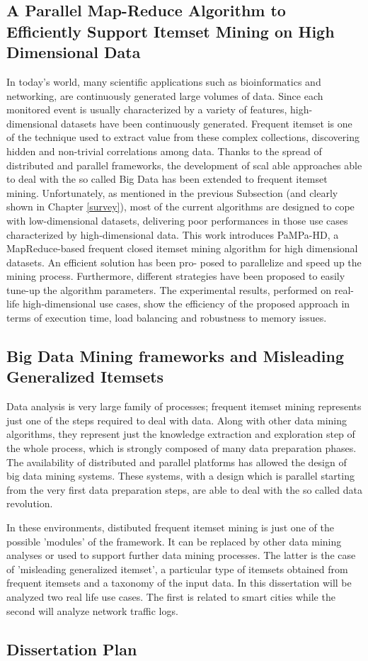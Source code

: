\subsection{A Parallel Map-Reduce Algorithm to Efficiently
Support Itemset Mining on High Dimensional Data}
In today's world, many scientific applications such as bioinformatics and networking, are continuously generated large volumes of data. Since
each monitored event is usually characterized by a variety of features, high-
dimensional datasets have been continuously generated. 
Frequent itemset is one of the technique used to extract value from these complex collections, discovering hidden and non-trivial correlations among data. 
Thanks to the spread of distributed and parallel frameworks, the development of scal
able approaches able to deal with the so called Big Data has been extended
to frequent itemset mining. Unfortunately, as mentioned in the previous Subsection (and clearly shown in Chapter \ref{survey}), most of the current algorithms are designed to cope with low-dimensional datasets, delivering poor performances in those use cases characterized by high-dimensional data. This work introduces 
PaMPa-HD, a MapReduce-based frequent closed itemset mining
algorithm for high dimensional datasets. An efficient solution has been pro-
posed to parallelize and speed up the mining process. Furthermore, different
strategies have been proposed to easily tune-up the algorithm parameters.
The experimental results, performed on real-life high-dimensional use cases,
show the efficiency of the proposed approach in terms of execution time, load
balancing and robustness to memory issues.

\subsection{Big Data Mining frameworks and Misleading Generalized Itemsets}
Data analysis is very large family of processes; frequent itemset mining represents just one of the steps required to deal with data. Along with other data mining algorithms, they represent just the knowledge extraction and exploration step of the whole process, which is strongly composed of many data preparation phases.
The availability of distributed and parallel platforms has allowed the design of big data mining systems. These systems, with a design which is parallel starting from the very first data preparation steps, are able to deal with the so called data revolution.

In these environments, distibuted frequent itemset mining is just one of the possible 'modules' of the framework. It can be replaced by other data mining analyses or used to support further data mining processes. The latter is the case of 'misleading generalized itemset', a particular type of itemsets obtained from frequent itemsets and a taxonomy of the input data. In this dissertation will be analyzed two real life use cases. The first is related to smart cities while the second will analyze network traffic logs.
\subsection{Dissertation Plan}


